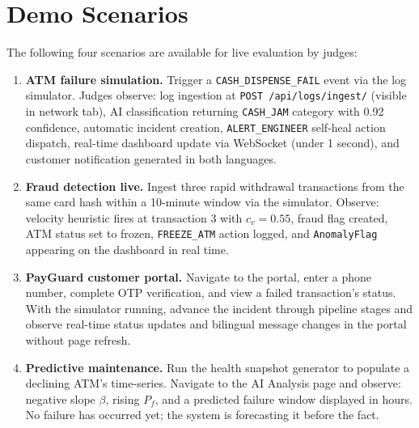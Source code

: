 \documentclass[11pt,a4paper]{article}
\begin{document}
\section{Demo Scenarios}

The following four scenarios are available for live evaluation by judges:

\begin{enumerate}
  \item \textbf{ATM failure simulation.} Trigger a \texttt{CASH\_DISPENSE\_FAIL} event via the log simulator. Judges observe: log ingestion at \texttt{POST /api/logs/ingest/} (visible in network tab), AI classification returning \texttt{CASH\_JAM} category with 0.92 confidence, automatic incident creation, \texttt{ALERT\_ENGINEER} self-heal action dispatch, real-time dashboard update via WebSocket (under 1 second), and customer notification generated in both languages.

  \item \textbf{Fraud detection live.} Ingest three rapid withdrawal transactions from the same card hash within a 10-minute window via the simulator. Observe: velocity heuristic fires at transaction 3 with $c_v = 0.55$, fraud flag created, ATM status set to frozen, \texttt{FREEZE\_ATM} action logged, and \texttt{AnomalyFlag} appearing on the dashboard in real time.

  \item \textbf{PayGuard customer portal.} Navigate to the portal, enter a phone number, complete OTP verification, and view a failed transaction's status. With the simulator running, advance the incident through pipeline stages and observe real-time status updates and bilingual message changes in the portal without page refresh.

  \item \textbf{Predictive maintenance.} Run the health snapshot generator to populate a declining ATM's time-series. Navigate to the AI Analysis page and observe: negative slope $\beta$, rising $P_f$, and a predicted failure window displayed in hours. No failure has occurred yet; the system is forecasting it before the fact.
\end{enumerate}
\end{document}
